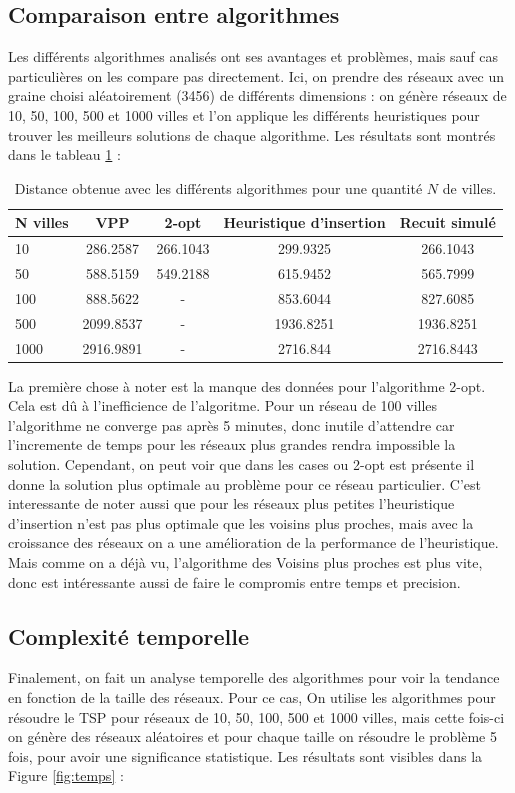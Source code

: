 \documentclass[a4paper,11pt,fleqn]{article}
\begin{document}
\subsection*{Comparaison entre algorithmes}
Les différents algorithmes analisés ont ses avantages et problèmes, mais sauf cas particulières on les compare pas directement. Ici, on prendre des réseaux avec un graine choisi aléatoirement (3456) de différents dimensions : on génère réseaux de 10, 50, 100, 500 et 1000 villes et l'on applique les différents heuristiques pour trouver les meilleurs solutions de chaque algorithme. Les résultats sont montrés dans le tableau \ref{tab:distances} : 
\begin{table}[H]
    \centering
    \caption{Distance obtenue avec les différents algorithmes pour une quantité $N$ de villes.}
    \label{tab:distances}
    \begin{tabular}{lcccc}
        \hline
        N villes & VPP & 2-opt & Heuristique d'insertion & Recuit simulé \\ \hline\hline
        10  & 286.2587  & 266.1043  & 299.9325 & 266.1043 \\
        50  & 588.5159  & 549.2188  & 615.9452 & 565.7999 \\
        100 & 888.5622 & - & 853.6044 & 827.6085 \\
        500 & 2099.8537 & - & 1936.8251 & 1936.8251 \\
        1000 & 2916.9891 & - & 2716.844 & 2716.8443  \\ \hline
    \end{tabular}
\end{table}

La première chose à noter est la manque des données pour l'algorithme 2-opt. Cela est dû à l'inefficience de l'algoritme. Pour un réseau de 100 villes l'algorithme ne converge pas après 5 minutes, donc inutile d'attendre car l'incremente de temps pour les réseaux plus grandes rendra impossible la solution. Cependant, on peut voir que dans les cases ou 2-opt est présente il donne la solution plus optimale au problème pour ce réseau particulier. C'est interessante de noter aussi que pour les réseaux plus petites l'heuristique d'insertion n'est pas plus optimale que les voisins plus proches, mais avec la croissance des réseaux on a une amélioration de la performance de l'heuristique. Mais comme on a déjà vu, l'algorithme des Voisins plus proches est plus vite, donc est intéressante aussi de faire le compromis entre temps et precision.

\subsection*{Complexité temporelle}
Finalement, on fait un analyse temporelle des algorithmes pour voir la tendance en fonction de la taille des réseaux. Pour ce cas, On utilise les algorithmes pour résoudre le TSP pour réseaux de 10, 50, 100, 500 et 1000 villes, mais cette fois-ci on génère des réseaux aléatoires et pour chaque taille on résoudre le problème 5 fois, pour avoir une significance statistique. Les résultats sont visibles dans la Figure \ref{fig:temps} :
\end{document}
